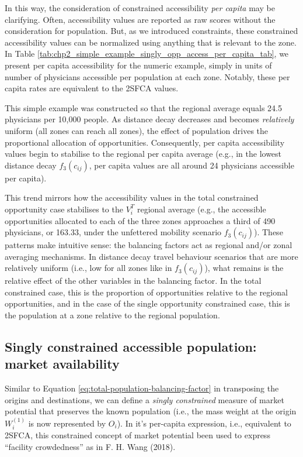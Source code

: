 \documentclass[
11pt, %
oneside, %
english, %
singlespacing, %
]{macthesis} %
\begin{document}
In this way, the consideration of constrained accessibility \emph{per capita} may be clarifying. Often, accessibility values are reported as raw scores without the consideration for population. But, as we introduced constraints, these constrained accessibility values can be normalized using anything that is relevant to the zone. In Table \ref{tab:chp2_simple_example_singly_opp_access_per_capita_tab}, we present per capita accessibility for the numeric example, simply in units of number of physicians accessible per population at each zone. Notably, these per capita rates are equivalent to the 2SFCA values.



This simple example was constructed so that the regional average equals 24.5 physicians per 10,000 people. As distance decay decreases and becomes \emph{relatively} uniform (all zones can reach all zones), the effect of population drives the proportional allocation of opportunities. Consequently, per capita accessibility values begin to stabilise to the regional per capita average (e.g., in the lowest distance decay \(f_3(c_{ij})\), per capita values are all around 24 physicians accessible per capita).

This trend mirrors how the accessibility values in the total constrained opportunity case stabilises to the \(V_i^T\) regional average (e.g., the accessible opportunities allocated to each of the three zones approaches a third of 490 physicians, or 163.33, under the unfettered mobility scenario \(f_3(c_{ij})\)). These patterns make intuitive sense: the balancing factors act as regional and/or zonal averaging mechanisms. In distance decay travel behaviour scenarios that are more relatively uniform (i.e., low for all zones like in \(f_3(c_{ij})\)), what remains is the relative effect of the other variables in the balancing factor. In the total constrained case, this is the proportion of opportunities relative to the regional opportunities, and in the case of the single opportunity constrained case, this is the population at a zone relative to the regional population.

\subsection{Singly constrained accessible population: market availability}\label{singly-constrained-accessible-population-market-availability}

Similar to Equation \ref{eq:total-population-balancing-factor} in transposing the origins and destinations, we can define a \emph{singly constrained} measure of market potential that preserves the known population (i.e., the mass weight at the origin \(W_i^{(1)}\) is now represented by \(O_i\)). In it's per-capita expression, i.e., equivalent to 2SFCA, this constrained concept of market potential been used to express ``facility crowdedness'' as in F. H. Wang (2018).
\end{document}
